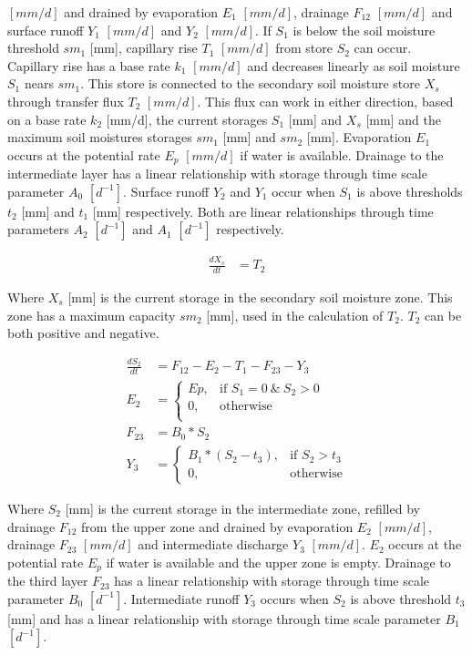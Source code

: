 \noindent$[mm/d]$ and drained by evaporation $E_1$ $[mm/d]$, drainage $F_{12}$ $[mm/d]$ and surface runoff $Y_1$ $[mm/d]$ and $Y_2$ $[mm/d]$. If $S_1$ is below the soil moisture threshold $sm_1$ [mm], capillary rise $T_1$  $[mm/d]$ from store $S_2$ can occur. Capillary rise has a base rate $k_1$  $[mm/d]$ and decreases linearly as soil moisture $S_1$ nears $sm_1$. This store is connected to the secondary soil moisture store $X_s$ through transfer flux $T_2$  $[mm/d]$. This flux can work in either direction, based on a base rate $k_2$ [mm/d], the current storages $S_1$ [mm] and $X_s$ [mm] and the maximum soil moistures storages $sm_1$ [mm] and $sm_2$ [mm]. Evaporation $E_1$ occurs at the potential rate $E_p$ $[mm/d]$ if water is available. Drainage to the intermediate layer has a linear relationship with storage through time scale parameter $A_0$ $[d^{-1}]$. Surface runoff $Y_2$ and $Y_1$ occur when $S_1$ is above thresholds $t_2$ [mm] and $t_1$ [mm] respectively. Both are linear relationships through time parameters $A_2$ $[d^{-1}]$ and $A_1$ $[d^{-1}]$ respectively.

\begin{align}
	\frac{dX_s}{dt} &= T_2
\end{align}

Where $X_s$ [mm] is the current storage in the secondary soil moisture zone. This zone has a maximum capacity $sm_2$ [mm], used in the calculation of $T_2$. $T_2$ can be both positive and negative.

\begin{align}
	\frac{dS_2}{dt} &= F_{12}-E_2-T_1-F_{23}-Y_3\\
	E_2 &= \begin{cases}
		Ep, &\text{if } S_1 = 0 ~\&~ S_2 > 0\\
		0, & \text{otherwise} \\
	\end{cases} \\
	F_{23} &= B_0*S_2\\
	Y_3 &= 
	\begin{cases}
		B_1*(S_2-t_3), & \text{if } S_2 > t_3 \\
		0, & \text{otherwise}
	\end{cases}
\end{align}

Where $S_2$ [mm] is the current storage in the intermediate zone, refilled by drainage $F_{12}$ from the upper zone and drained by evaporation $E_2$ $[mm/d]$, drainage $F_{23}$ $[mm/d]$ and intermediate discharge $Y_3$ $[mm/d]$. $E_2$ occurs at the potential rate $E_p$ if water is available and the upper zone is empty. Drainage to the third layer $F_{23}$ has a linear relationship with storage through time scale parameter $B_0$ $[d^{-1}]$. Intermediate runoff $Y_3$ occurs when $S_2$ is above threshold $t_3$ [mm] and has a linear relationship with storage through time scale parameter $B_1$ $[d^{-1}]$.

